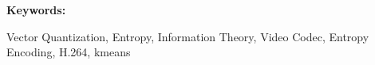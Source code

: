 \thispagestyle{plain}
\def\abstractname{Abstract}
\begin{abstract}
\end{abstract}
\vspace{0.5in}
\begin{Large}
\textbf{Keywords:}\\
\end{Large}
Vector Quantization, Entropy, Information Theory, Video Codec, Entropy Encoding, H.264, kmeans
